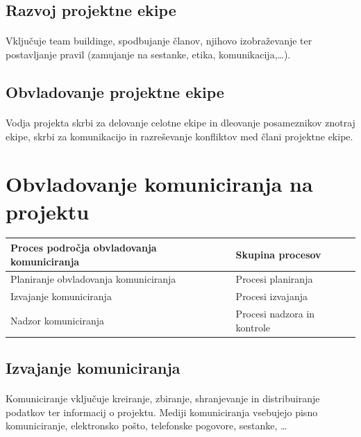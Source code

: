 \documentclass[a4paper,12pt]{report}
\begin{document}
      \subsection{Razvoj projektne ekipe}
         \paragraph{} Vključuje team buildinge, spodbujanje članov, njihovo izobraževanje ter postavljanje pravil (zamujanje na sestanke, etika, komunikacija,\dots).
      \subsection{Obvladovanje projektne ekipe}
         \paragraph{} Vodja projekta skrbi za delovanje celotne ekipe in dleovanje posameznikov znotraj ekipe, skrbi za komunikacijo in razreševanje konfliktov med člani projektne ekipe.

   \section{Obvladovanje komuniciranja na projektu}
      \begin{center}
         \begin{tabular}{|l|l|}
            \hline
            \textbf{Proces področja obvladovanja komuniciranja} & \textbf{Skupina procesov} \\
            \hline
            \hline
            Planiranje obvladovanja komuniciranja & Procesi planiranja \\
            \hline
            Izvajanje komuniciranja & Procesi izvajanja \\
            \hline
            Nadzor komuniciranja &  Procesi nadzora in kontrole \\
            \hline
         \end{tabular}
      \end{center}

      \subsection{Izvajanje komuniciranja}
         \paragraph{} Komuniciranje vključuje kreiranje, zbiranje, shranjevanje in distribuiranje podatkov ter informacij o projektu. Mediji komuniciranja vsebujejo pisno komuniciranje, elektronsko pošto, telefonske pogovore, sestanke, \dots
\end{document}
